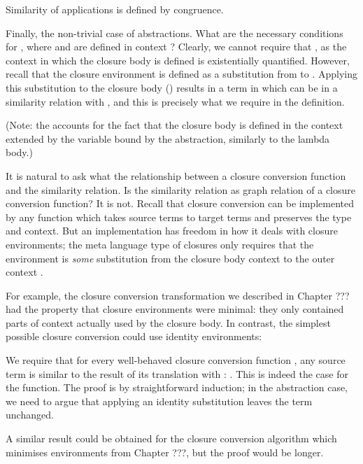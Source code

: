 \documentclass[bsc,frontabs,twoside,singlespacing,parskip,deptreport]{infthesis}
\theoremstyle{definition}
\begin{document}
Similarity of applications is defined by congruence.

Finally, the non-trivial case of abstractions. What are the necessary
conditions for , where  and 
 are defined in context ? Clearly, we cannot require
that , as the context  in which the closure body is
defined is existentially quantified. However, recall that the closure environment
 is defined as a substitution from  to . Applying
this substitution to the closure body ()
results in a term in  which can be in a similarity relation with
, and this is precisely what we require in the definition.

(Note: the  accounts for the fact that the closure body is
defined in the context  extended by the variable bound by the
abstraction, similarly to the lambda body.)

It is natural to ask what the relationship between a closure
conversion function and the similarity relation. Is the similarity
relation as graph relation of a closure conversion function? It is
not. Recall that closure conversion can be implemented by any function
which takes source terms to target terms and preserves the type and
context. But an implementation has freedom in how it deals with
closure environments; the meta language type of closures only requires
that the environment is \textit{some} substitution from the closure
body context  to the outer context .

For example, the closure conversion transformation we described in
Chapter ??? had the property that closure environments were minimal:
they only contained parts of context actually used by the closure
body. In contrast, the simplest possible closure conversion could use
identity environments:


We require that for every well-behaved closure conversion function , any
source term  is similar to the result of its translation with
: . This is indeed the case for the 
function. The proof is by straightforward induction; in the
abstraction case, we need to argue that applying an identity substitution
leaves the term unchanged.


A similar result could be obtained for the closure conversion
algorithm which minimises environments from Chapter ???, but the proof
would be longer.
\end{document}
